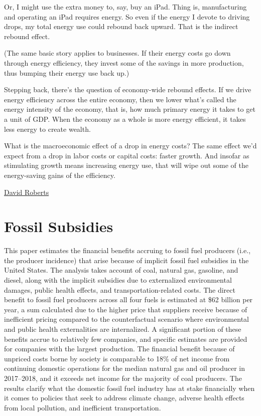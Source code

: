 \documentclass[
]{book}
\begin{document}
Or, I might use the extra money to, say, buy an iPad. Thing is, manufacturing and operating an iPad requires energy. So even if the energy I devote to driving drops, my total energy use could rebound back upward. That is the indirect rebound effect.

(The same basic story applies to businesses. If their energy costs go down through energy efficiency, they invest some of the savings in more production, thus bumping their energy use back up.)

Stepping back, there's the question of economy-wide rebound effects. If we drive energy efficiency across the entire economy, then we lower what's called the energy intensity of the economy, that is, how much primary energy it takes to get a unit of GDP. When the economy as a whole is more energy efficient, it takes less energy to create wealth.

What is the macroeconomic effect of a drop in energy costs? The same effect we'd expect from a drop in labor costs or capital costs: faster growth. And insofar as stimulating growth means increasing energy use, that will wipe out some of the energy-saving gains of the efficiency.

\href{https://grist.org/energy-efficiency/whats-the-deal-with-the-rebound-effect/}{David Roberts}

\hypertarget{fossil-subsidies}{%
\chapter{Fossil Subsidies}\label{fossil-subsidies}}

This paper estimates the financial benefits accruing to fossil fuel producers (i.e., the producer incidence) that arise because of implicit fossil fuel subsidies in the United States. The analysis takes account of coal, natural gas, gasoline, and diesel, along with the implicit subsidies due to externalized environmental damages, public health effects, and transportation-related costs. The direct benefit to fossil fuel producers across all four fuels is estimated at \$62 billion per year, a sum calculated due to the higher price that suppliers receive because of inefficient pricing compared to the counterfactual scenario where environmental and public health externalities are internalized. A significant portion of these benefits accrue to relatively few companies, and specific estimates are provided for companies with the largest production. The financial benefit because of unpriced costs borne by society is comparable to 18\% of net income from continuing domestic operations for the median natural gas and oil producer in 2017--2018, and it exceeds net income for the majority of coal producers. The results clarify what the domestic fossil fuel industry has at stake financially when it comes to policies that seek to address climate change, adverse health effects from local pollution, and inefficient transportation.
\end{document}
